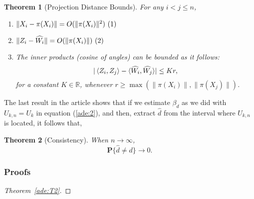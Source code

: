 \documentclass[12pt]{exam}
\newcommand\inlinetag{\stepcounter{equation}\ (\theequation)}
\def\R{\ensuremath{\mathbb{R}}}
\def\P{\ensuremath{\mathbf{P}}}
\newtheorem{theorem}{Theorem}[section]
\theoremstyle{remark}
\newcommand{\angles}[1]{\ensuremath{\left\langle}#1\ensuremath{\right\rangle} }
\begin{document}
\begin{theorem}[Projection Distance Bounds]\label{ade:T3}
  For any $i<j \leq n$,
  \begin{enumerate}
    \item[(i)]    \( \|X_i-\pi(X_i)\|  =   O(\|\pi (X_i)\|^2) \hfill\inlinetag  \)
    \item[(ii)]   \( \|Z_i-\widehat{W_i}\|  =   O(\|\pi (X_i) \|) \hfill\inlinetag \)
    \item[(iii)]  The inner products (cosine of angles) can be bounded as it follows:
    \begin{equation}\label{ade:6}
      |\angles{Z_i,Z_j} - \langle\widehat{W_i}, \widehat{W_j}\rangle| \leq K r,
    \end{equation}
    for a constant $K\in\R$, whenever $r \geq \max (\|\pi(X_i)\|,\|\pi(X_j)\|)$.
  \end{enumerate}
\end{theorem}

The last result in the article shows that if we estimate $\beta_d$ as we did with $U_{k,n} = U_k$ in equation (\ref{ade:2}), and then, extract $\widehat{d}$ from the interval where $U_{k,n}$ is located, it follows that,
\begin{theorem}[Consistency]\label{ade:T4}
  When $n\to \infty$,
  \[ \P\{\widehat{d} \neq d\} \to 0.\]
\end{theorem}

\subsubsection*{Proofs}

\begin{proof}[Theorem~\ref{ade:T2}]
  
\end{proof}
\end{document}
